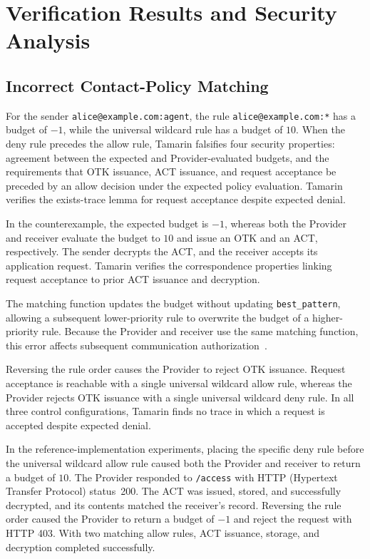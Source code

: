
\section{Verification Results and Security Analysis}
\label{sec:results}

\subsection{Incorrect Contact-Policy Matching}
\label{subsec:policy-evaluation-consistency}

For the sender \nolinkurl{alice@example.com:agent}, the rule \nolinkurl{alice@example.com:*} has a budget of $-1$, while the universal wildcard rule has a budget of $10$. When the deny rule precedes the allow rule, Tamarin falsifies four security properties: agreement between the expected and Provider-evaluated budgets, and the requirements that OTK issuance, ACT issuance, and request acceptance be preceded by an allow decision under the expected policy evaluation. Tamarin verifies the exists-trace lemma for request acceptance despite expected denial.

In the counterexample, the expected budget is $-1$, whereas both the Provider and receiver evaluate the budget to $10$ and issue an OTK and an ACT, respectively. The sender decrypts the ACT, and the receiver accepts its application request. Tamarin verifies the correspondence properties linking request acceptance to prior ACT issuance and decryption.

The matching function updates the budget without updating \texttt{best\_pattern}, allowing a subsequent lower-priority rule to overwrite the budget of a higher-priority rule. Because the Provider and receiver use the same matching function, this error affects subsequent communication authorization~\cite{sagaReferenceImpl2026}.

Reversing the rule order causes the Provider to reject OTK issuance. Request acceptance is reachable with a single universal wildcard allow rule, whereas the Provider rejects OTK issuance with a single universal wildcard deny rule. In all three control configurations, Tamarin finds no trace in which a request is accepted despite expected denial.

In the reference-implementation experiments, placing the specific deny rule before the universal wildcard allow rule caused both the Provider and receiver to return a budget of $10$. The Provider responded to \texttt{/access} with HTTP (Hypertext Transfer Protocol) status~200. The ACT was issued, stored, and successfully decrypted, and its contents matched the receiver's record. Reversing the rule order caused the Provider to return a budget of $-1$ and reject the request with HTTP 403. With two matching allow rules, ACT issuance, storage, and decryption completed successfully.

